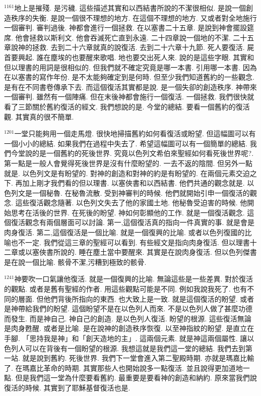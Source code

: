 \documentclass{book}
\begin{document}
$^{1161}$地上是摧殘.
是污穢.
這些描述其實和以西結書所說的不潔很相似.
是說一個創造秩序的失衡.
是說一個很不理想的地方.
在這個不理想的地方.
又或者對全地施行一個審判.
審判過後.
神都會進行一個拯救.
在以塞書二十五章.
是說到神會擺設筵席.
他會拯救以斯利文.
他會吞滅死亡直到永遠.
二十四章說一個地的不潔.
二十五章說神的拯救.
去到二十六章就真的說復活.
去到二十六章十九節.
死人要復活.
屍首要興起.
誰在塵埃的也要醒來歌唱.
地也要交出死人來.
說的是這些字眼.
其實和但以理書的用詞是很相似的.
但我們就不確定究竟是哪一本書.
引用哪一本書.
因為在以塞書的寫作年份.
是不太能夠確定到是何時.
但至少我們知道舊約的一些觀念.
是有在不同書卷傳承下去.
而這個復活其實都是說.
是一個失卻的創造秩序.
神帶來一個審判.
雖然有一個陣痛.
但在末後神都會施行一個復活.
一個拯救.
我們很快就看了三節關於舊約復活的經文.
我們想說的是.
今堂的總結.
要看一個舊約的復活觀.
其實真的很不簡單.

$^{1201}$一堂只能夠用一個走馬燈.
很快地掃描舊約如何看復活或盼望.
但這幅圖可以有一個小小的總結.
如果我們在過程中失去了.
希望這幅圖可以有一個簡單的總結.
我們今堂說的是一個舊約的死後世界.
究竟以色列文希伯來聖經如何看死後世界呢?.
第一點是一般人會覺得死後世界是沒有什麼盼望的.
一去不返的陰間.
但另外一點就是.
以色列文是有盼望的.
對神的創造和對神的約是有盼望的.
在兩個元素交迫之下.
再加上剛才我們看的但以理書.
以塞俠書和以西結書.
他們共通的觀念就是.
以色列文是一個秘魯.
在秘魯流散.
受到神審判的時候.
他們就開始引申一個復活的觀念.
這些復活觀念隨著.
以色列文失去了他的家國土地.
他秘魯受迫害的時候.
他開始思考在活後的世界.
在死後的盼望.
神如何彰顯他的工作.
就是一個復活觀念.
這個復活觀念有兩個層面可以討論.
第一,這個復活真的指向一件真實的事.
就是會是肉身復活.
第二,這個復活是一個比喻.
就是一個復興的比喻.
或者以色列復國的比喻也不一定.
我們從這三章的聖經可以看到.
有些經文是指向肉身復活.
但以理書十二章或以塞俠書所說的.
睡在塵土當中要醒來.
其實是在說肉身復活.
但以色列傑書是在說一個比喻.
骸骨不潔,污糟到極致的骸骨.

$^{1241}$神要吹一口氣讓他復活.
就是一個復興的比喻.
無論這些是一些差異.
對於復活的觀點.
或者是舊有聖經的作者.
用這些觀點可能是不同.
例如我說我死了.
也有不同的層面.
但他們背後所指向的東西.
也大致上是一致.
就是這個復活的盼望.
或者是神帶給我們的盼望.
這個盼望不是在以色列人而來.
不是以色列人做了甚麼功德而發生.
而是神自己.
神自己的創造.
是以色列人復活.
盼望的根源.
這些復活無論是肉身甦醒.
或者是比喻.
是在說神的創造秩序恢復.
以至神指紋的盼望.
是直立在手腳.
「思持我是神」和「創天造地的主」.
這兩個元素.
就是神這兩個屬性.
讓以色列人可以在背後有一個盼望的根源.
我想這就是我們這一堂的總結.
我們去到第一站.
就是說到舊約.
死後世界.
我們下一堂會進入第二聖殿時期.
亦就是瑪嘉比輸了.
在瑪嘉比革命的時期.
其實那些人也開始說多一點復活.
並且說得更加道地一點.
但是我們這一堂為什麼要看舊約.
最重要是要看神的創造和納約.
原來當我們說復活的時候.
其實到了耶穌基督復活也是.
\end{document}

